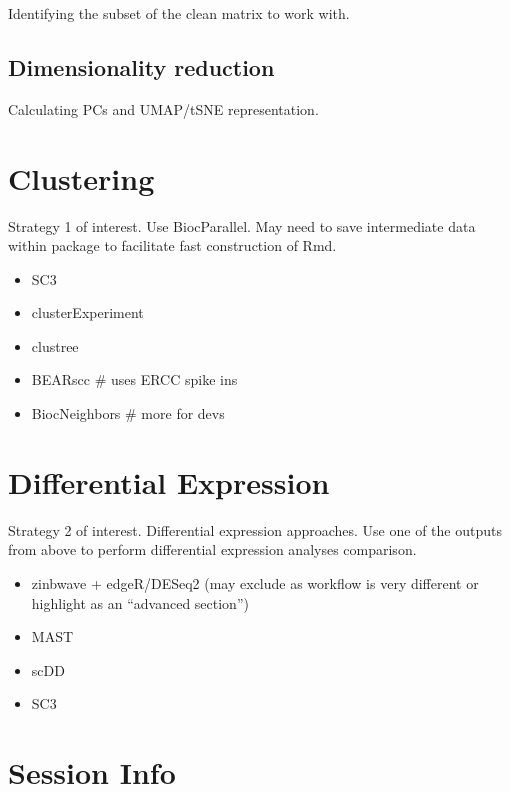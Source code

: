 \documentclass[]{book}
\providecommand{\tightlist}{%
  \setlength{\itemsep}{0pt}\setlength{\parskip}{0pt}}
\begin{document}
Identifying the subset of the clean matrix to work with.

\hypertarget{dimensionality-reduction}{%
\subsection{Dimensionality reduction}\label{dimensionality-reduction}}

Calculating PCs and UMAP/tSNE representation.

\hypertarget{clustering}{%
\section{Clustering}\label{clustering}}

Strategy 1 of interest. Use BiocParallel. May need to save intermediate data within package to facilitate fast construction of Rmd.

\begin{itemize}
\tightlist
\item
  SC3
\item
  clusterExperiment
\item
  clustree
\item
  BEARscc \# uses ERCC spike ins
\item
  BiocNeighbors \# more for devs
\end{itemize}

\hypertarget{differential-expression}{%
\section{Differential Expression}\label{differential-expression}}

Strategy 2 of interest. Differential expression approaches. Use one of the outputs from above to perform differential expression analyses comparison.

\begin{itemize}
\tightlist
\item
  zinbwave + edgeR/DESeq2 (may exclude as workflow is very different or highlight as an ``advanced section'')
\item
  MAST
\item
  scDD
\item
  SC3
\end{itemize}

\hypertarget{session-info}{%
\section{Session Info}\label{session-info}}
\end{document}
